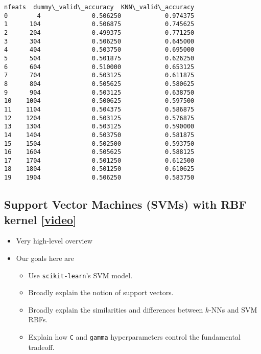 \documentclass[11pt]{article}
\makeatletter
\providecommand{\tightlist}{%
      \setlength{\itemsep}{0pt}\setlength{\parskip}{0pt}}
\newcommand{\boxspacing}{\kern\kvtcb@left@rule\kern\kvtcb@boxsep}
\newcommand{\prompt}[4]{
        {\ttfamily\llap{{\color{#2}[#3]:\hspace{3pt}#4}}\vspace{-\baselineskip}}
    }
\makeatother
\begin{document}
            \begin{tcolorbox}[breakable, size=fbox, boxrule=.5pt, pad at break*=1mm, opacityfill=0]
\prompt{Out}{outcolor}{41}{\boxspacing}
\begin{Verbatim}[commandchars=\\\{\}]
    nfeats  dummy\_valid\_accuracy  KNN\_valid\_accuracy
0        4              0.506250            0.974375
1      104              0.506875            0.745625
2      204              0.499375            0.771250
3      304              0.506250            0.645000
4      404              0.503750            0.695000
5      504              0.501875            0.626250
6      604              0.510000            0.653125
7      704              0.503125            0.611875
8      804              0.505625            0.580625
9      904              0.503125            0.638750
10    1004              0.500625            0.597500
11    1104              0.504375            0.586875
12    1204              0.503125            0.576875
13    1304              0.503125            0.590000
14    1404              0.503750            0.581875
15    1504              0.502500            0.593750
16    1604              0.505625            0.588125
17    1704              0.501250            0.612500
18    1804              0.501250            0.610625
19    1904              0.506250            0.583750
\end{Verbatim}
\end{tcolorbox}
        
    

    \subsection{\texorpdfstring{Support Vector Machines (SVMs) with RBF
kernel
{[}\href{https://youtu.be/ic_zqOhi020}{video}{]}}{Support Vector Machines (SVMs) with RBF kernel {[}video{]}}}\label{support-vector-machines-svms-with-rbf-kernel-video}

\begin{itemize}
\tightlist
\item
  Very high-level overview
\item
  Our goals here are

  \begin{itemize}
  \tightlist
  \item
    Use \texttt{scikit-learn}'s SVM model.
  \item
    Broadly explain the notion of support vectors.\\
  \item
    Broadly explain the similarities and differences between \(k\)-NNs
    and SVM RBFs.
  \item
    Explain how \texttt{C} and \texttt{gamma} hyperparameters control
    the fundamental tradeoff.
  \end{itemize}
\end{itemize}
\end{document}
